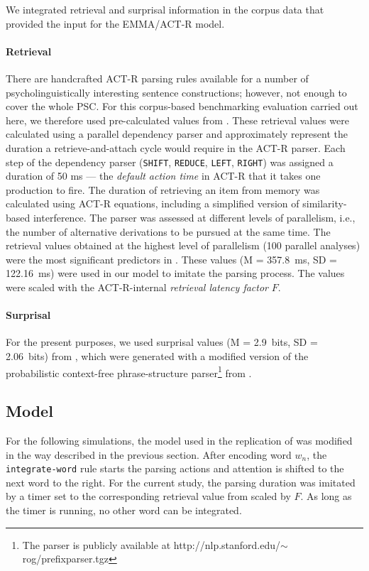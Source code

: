 We integrated retrieval and surprisal information in the corpus data that provided the input for the EMMA/ACT-R model.

\paragraph{Retrieval}
There are handcrafted ACT-R parsing rules available for a number of psycholinguistically interesting sentence constructions;  however, not enough to cover the whole PSC.  For this corpus-based benchmarking evaluation carried out here, we therefore used pre-calculated values from \cite{BostonHaleVasishth2011}.  These retrieval values were calculated using a parallel dependency parser and approximately represent the duration a retrieve-and-attach cycle would require in the ACT-R parser.  Each step of the dependency parser (\texttt{SHIFT}, \texttt{REDUCE}, \texttt{LEFT}, \texttt{RIGHT}) was assigned a duration of 50 ms --- the \emph{default action time} in ACT-R that it takes one production to fire.  The duration of retrieving an item from memory was calculated using ACT-R equations, including a simplified version of similarity-based interference.  The parser was assessed at different levels of parallelism, i.e., the number of alternative derivations to be pursued at the same time.
The retrieval values obtained at the highest level of parallelism (100 parallel analyses) were the most significant predictors in \cite{BostonHaleVasishth2011}.  These values (M = 357.8~ms, SD = 122.16~ms) were used in our model to imitate the parsing process.  The values were scaled with the ACT-R-internal  \emph{retrieval latency factor} $F$.

\paragraph{Surprisal}
For the present purposes, we used surprisal values (M = 2.9~bits, SD = 2.06~bits) from \cite{Boston2008}, which were generated with a modified version of the probabilistic context-free phrase-structure parser\footnote{The parser is publicly available at http://nlp.stanford.edu/$\sim$rog/prefixparser.tgz} from \cite{Levy2008}.

\subsection{Model}
For the following simulations, the model used in the replication of \cite{Salvucci2001} was modified in the way described in the previous section.  
After encoding word $w_n$, the \texttt{integrate-word} rule starts the parsing actions and attention is shifted to the next word to the right.  For the current study, the parsing duration was imitated by a timer set to the corresponding retrieval value from \cite{Boston2008} scaled by $F$.  As long as the timer is running, no other word can be integrated.

